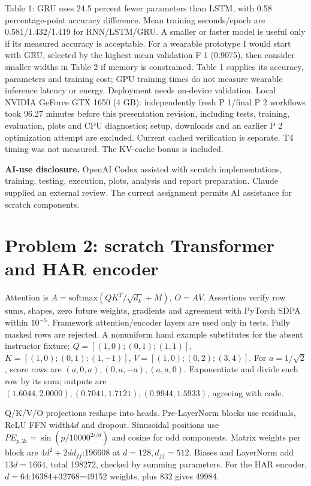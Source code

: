 \documentclass[11pt,a4paper]{article}
\begin{document}
Table 1: GRU uses 24.5 percent fewer parameters than LSTM, with 0.58 percentage-point accuracy difference. Mean training seconds/epoch are 0.581/1.432/1.419 for RNN/LSTM/GRU. A smaller or faster model is useful only if its measured accuracy is acceptable.
For a wearable prototype I would start with GRU, selected by the highest mean validation F 1 (0.9075), then consider smaller widths in Table 2 if memory is constrained. Table 1 supplies its accuracy, parameters and training cost; GPU training times do not measure wearable inference latency or energy. Deployment needs on-device validation.
Local NVIDIA GeForce GTX 1650 (4 GB): independently fresh P 1/final P 2 workflows took 96.27 minutes before this presentation revision, including tests, training, evaluation, plots and CPU diagnostics; setup, downloads and an earlier P 2 optimization attempt are excluded. Current cached verification is separate. T4 timing was not measured. The KV-cache bonus is included.
\par\textbf{AI-use disclosure.} OpenAI Codex assisted with scratch implementations,
training, testing, execution, plots, analysis and report preparation. Claude supplied
an external review. The current assignment permits AI assistance for scratch components.
\newpage
\section*{Problem 2: scratch Transformer and HAR encoder}
Attention is $A=\mathrm{softmax}(QK^T/\sqrt{d_k}+M)$, $O=AV$.
Assertions verify row sums, shapes, zero future weights, gradients and agreement
with PyTorch SDPA within $10^{-5}$. Framework attention/encoder layers are used
only in tests. Fully masked rows are rejected. A nonuniform hand example substitutes
for the absent instructor fixture: $Q=[(1,0);(0,1);(1,1)]$,
$K=[(1,0);(0,1);(1,-1)]$, $V=[(1,0);(0,2);(3,4)]$.
For $a=1/\sqrt 2$, score rows are $(a,0,a),(0,a,-a),(a,a,0)$.
Exponentiate and divide each row by its sum; outputs are
$(1.6044,2.0000),(0.7041,1.7121),(0.9944,1.5933)$, agreeing with code.

Q/K/V/O projections reshape into heads. Pre-LayerNorm blocks use residuals,
ReLU FFN width$4d$ and dropout. Sinusoidal positions use
$PE_{p,2i}=\sin(p/10000^{2i/d})$ and cosine for odd components.
Matrix weights per block are $4d^2+2dd_{ff}$:196608 at $d=128,d_{ff}=512$.
Biases and LayerNorm add $13d=1664$, total 198272, checked by summing parameters.
For the HAR encoder, $d=64$:16384+32768=49152 weights, plus 832 gives 49984.
\end{document}
